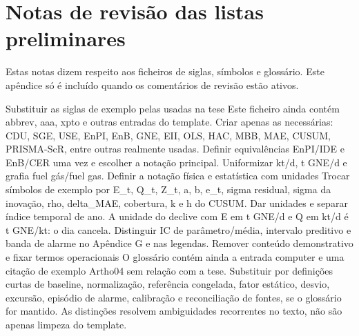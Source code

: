 \chapter{Notas de revisão das listas preliminares}
\label{app:revisao-editorial}

Estas notas dizem respeito aos ficheiros de siglas, símbolos e glossário.
Este apêndice só é incluído quando os comentários de revisão estão ativos.

{Substituir as siglas de exemplo pelas usadas na tese}
{Este ficheiro ainda contém abbrev, aaa, xpto e outras entradas do
template. Criar apenas as necessárias: CDU, SGE, USE, EnPI, EnB, GNE,
EII, OLS, HAC, MBB, MAE, CUSUM, PRISMA-ScR, entre outras realmente usadas.
Definir equivalências EnPI/IDE e EnB/CER uma vez e escolher a notação
principal. Uniformizar kt/d, t GNE/d e grafia fuel gás/fuel gas.}%
{Definir a notação física e estatística com unidades}
{Trocar símbolos de exemplo por E\_t, Q\_t, Z\_t, a, b, e\_t, sigma residual,
sigma da inovação, rho, delta\_MAE, cobertura, k e h do CUSUM.
Dar unidades e separar índice temporal de ano. A unidade do declive
com E em t GNE/d e Q em kt/d é t GNE/kt: o dia cancela.
Distinguir IC de parâmetro/média, intervalo preditivo e banda de alarme
no Apêndice G e nas legendas.}%
{Remover conteúdo demonstrativo e fixar termos operacionais}
{O glossário contém ainda a entrada computer e uma citação de exemplo
Artho04 sem relação com a tese. Substituir por definições curtas de
baseline, normalização, referência congelada, fator estático, desvio,
excursão, episódio de alarme, calibração e reconciliação de fontes,
se o glossário for mantido. As distinções resolvem ambiguidades
recorrentes no texto, não são apenas limpeza do template.}%

